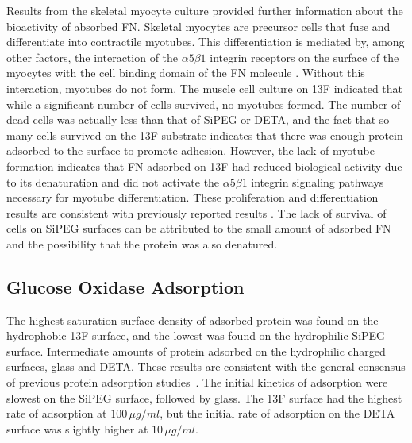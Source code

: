 Results from the skeletal myocyte culture provided further information
about the bioactivity of absorbed FN. Skeletal myocytes are precursor
cells that fuse and differentiate into contractile myotubes. This
differentiation is mediated by, among other factors, the interaction
of the $\alpha5\beta1$ integrin receptors on the surface of the myocytes
with the cell binding domain of the FN molecule \cite{Michael2003}.
Without this interaction, myotubes do not form. The muscle cell culture
on 13F indicated that while a significant number of cells survived,
no myotubes formed. The number of dead cells was actually less than
that of SiPEG or DETA, and the fact that so many cells survived on
the 13F substrate indicates that there was enough protein adsorbed
to the surface to promote adhesion. However, the lack of myotube formation
indicates that FN adsorbed on 13F had reduced biological activity
due to its denaturation and did not activate the $\alpha5\beta1$
integrin signaling pathways necessary for myotube differentiation.
These proliferation and differentiation results are consistent with
previously reported results \cite{Michael2003}. The lack of survival
of cells on SiPEG surfaces can be attributed to the small amount of
adsorbed FN and the possibility that the protein was also denatured. 


\subsection{Glucose Oxidase Adsorption}

The highest saturation surface density of adsorbed protein was found
on the hydrophobic 13F surface, and the lowest was found on the hydrophilic
SiPEG surface. Intermediate amounts of protein adsorbed on the hydrophilic
charged surfaces, glass and DETA. These results are consistent with
the general consensus of previous protein adsorption studies~\cite{Rabe2010}.
The initial kinetics of adsorption were slowest on the SiPEG surface,
followed by glass. The 13F surface had the highest rate of adsorption
at $100\,\mu g/ml$, but the initial rate of adsorption on the DETA
surface was slightly higher at $10\,\mu g/ml$.

